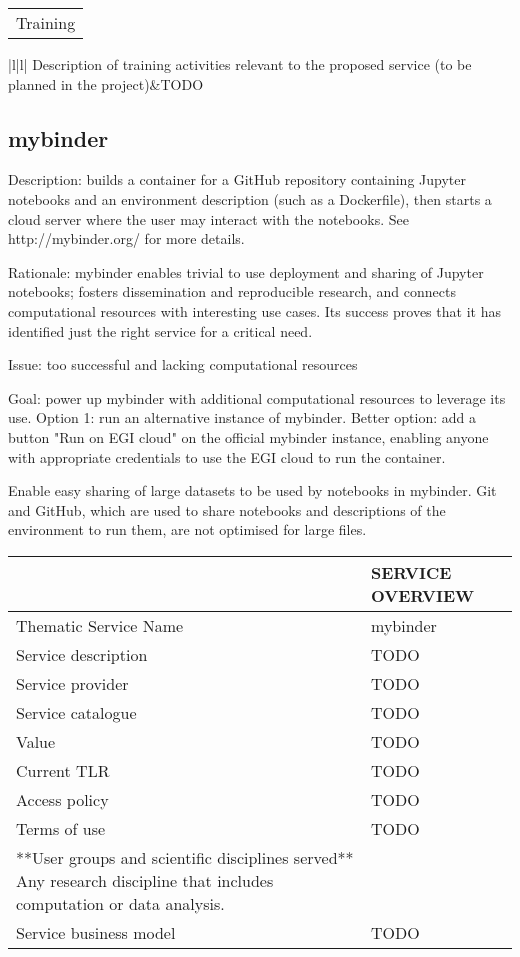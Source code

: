 \begin{tabular}{|l|}
\hline
Training
\hline
\end{tabular}
\begin{tabular}{|l|l|}
\hline
Description of training activities relevant to the proposed service (to be planned in the project)&TODO
\hline


\subsection{mybinder}

Description: builds a container for a GitHub repository containing Jupyter
notebooks and an environment description (such as a Dockerfile), then starts a
cloud server where the user may interact with the notebooks. See http://mybinder.org/
for more details.

Rationale: mybinder enables trivial to use deployment and sharing of
Jupyter notebooks; fosters dissemination and reproducible research,
and connects computational resources with interesting use cases.
Its success proves that it has identified just the right service for
a critical need.

Issue: too successful and lacking computational resources

Goal: power up mybinder with additional computational resources to
leverage its use. Option 1: run an alternative instance of mybinder.
Better option: add a button "Run on EGI cloud" on the official
mybinder instance, enabling anyone with appropriate credentials to use
the EGI cloud to run the container.

Enable easy sharing of large datasets to be used by notebooks in mybinder. Git
and GitHub, which are used to share notebooks and descriptions of the
environment to run them, are not optimised for large files.


\begin{tabular}{|l|l|}
\hline
 & SERVICE OVERVIEW\\
\hline
Thematic Service Name&mybinder\\
\hline
Service description&TODO\\
\hline
Service provider&TODO\\
\hline
Service catalogue&TODO\\
\hline
Value&TODO\\
\hline
Current TLR&TODO\\
\hline
Access policy&TODO\\
\hline
Terms of use&TODO\\
\hline
**User groups and scientific disciplines served** Any research discipline that includes computation or data analysis.  \\
\hline
Service business model&TODO\\
\hline
\end{tabular}


\end{tabular}
